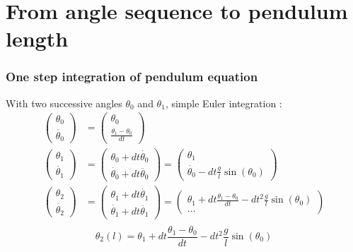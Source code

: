 \documentclass{beamer}
\begin{document}
\section{From angle sequence to pendulum length}

\begin{frame}
\frametitle{One step integration of pendulum equation}
With two successive angles $\theta_0$ and $\theta_1$, simple Euler integration :
\begin{align*}
  \left( \begin{array}{c} \theta_0 \\ \dot{\theta_0} \end{array} \right)&=
    \left( \begin{array}{c} \theta_0 \\ \frac{\theta_1 - \theta_0}{dt} \end{array} \right) \\
  \left( \begin{array}{c} \theta_1 \\ \dot{\theta_1} \end{array} \right) &=
    \left( \begin{array}{c} \theta_0  + dt \dot{\theta_0} \\ \dot{\theta_0} + dt \ddot{\theta_0} \end{array} \right)
    =
    \left( \begin{array}{c} \theta_1 \\ \dot{\theta_0} - dt \frac{g}{l} \sin(\theta_0) \end{array} \right)\\
  \left( \begin{array}{c} \theta_2 \\ \dot{\theta_2} \end{array} \right) &=
    \left( \begin{array}{c} \theta_1  + dt \dot{\theta_1} \\ \dot{\theta_1} + dt \ddot{\theta_1} \end{array} \right)
    =
    \left( \begin{array}{c} \theta_1 + dt \frac{\theta_1 - \theta_0}{dt} - dt^2 \frac{g}{l} \sin(\theta_0) \\ \ldots \end{array} \right)\\
\end{align*}
\[
  \theta_2 (l) = \theta_1 + dt \frac{\theta_1 - \theta_0}{dt} - dt^2 \frac{g}{l} \sin(\theta_0)
\]
\end{frame}
\end{document}
